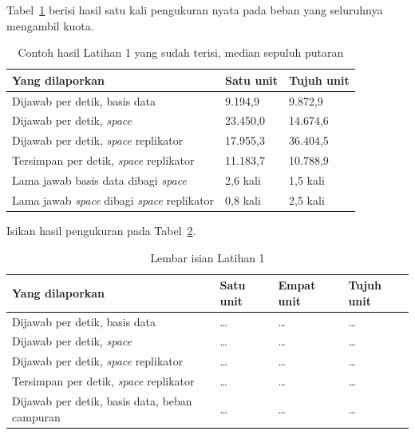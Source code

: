 Tabel~\ref{tab:lat1ruang-contoh} berisi hasil satu kali pengukuran nyata pada
beban yang seluruhnya mengambil kuota.

\begin{table}[htbp]
  \centering
  \caption{Contoh hasil Latihan 1 yang sudah terisi, median sepuluh putaran}
  \label{tab:lat1ruang-contoh}
  \begin{tabularx}{\textwidth}{|X|l|l|}
    \hline
    \textbf{Yang dilaporkan} & \textbf{Satu unit} & \textbf{Tujuh unit} \\
    \hline
    Dijawab per detik, basis data & 9.194,9 & 9.872,9 \\
    \hline
    Dijawab per detik, \textit{space} & 23.450,0 & 14.674,6 \\
    \hline
    Dijawab per detik, \textit{space} replikator & 17.955,3 & 36.404,5 \\
    \hline
    Tersimpan per detik, \textit{space} replikator & 11.183,7 & 10.788,9 \\
    \hline
    Lama jawab basis data dibagi \textit{space} & 2,6 kali & 1,5 kali \\
    \hline
    Lama jawab \textit{space} dibagi \textit{space} replikator & 0,8 kali & 2,5 kali \\
    \hline
  \end{tabularx}
\end{table}

Isikan hasil pengukuran pada Tabel~\ref{tab:lat1ruang-hasil}.

\begin{table}[htbp]
  \centering
  \caption{Lembar isian Latihan 1}
  \label{tab:lat1ruang-hasil}
  \begin{tabularx}{\textwidth}{|X|l|l|l|}
    \hline
    \textbf{Yang dilaporkan} & \textbf{Satu unit} & \textbf{Empat unit} & \textbf{Tujuh unit} \\
    \hline
    Dijawab per detik, basis data & \dots & \dots & \dots \\
    \hline
    Dijawab per detik, \textit{space} & \dots & \dots & \dots \\
    \hline
    Dijawab per detik, \textit{space} replikator & \dots & \dots & \dots \\
    \hline
    Tersimpan per detik, \textit{space} replikator & \dots & \dots & \dots \\
    \hline
    Dijawab per detik, basis data, beban campuran & \dots & \dots & \dots \\
    \hline
  \end{tabularx}
\end{table}

